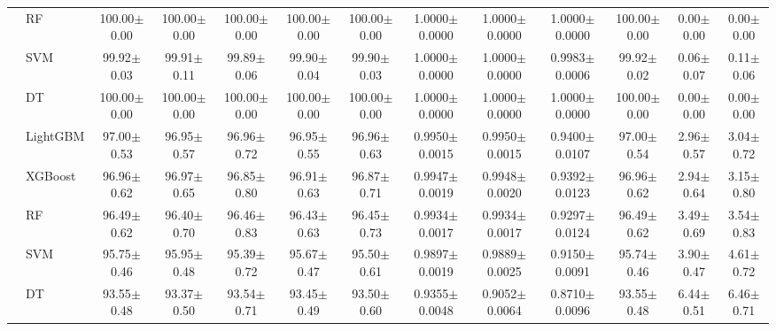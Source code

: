 \begin{tabular}{@{}llccccccccccc@{}}
 & RF & 100.00{\tiny$\pm$0.00} & 100.00{\tiny$\pm$0.00} & 100.00{\tiny$\pm$0.00} & 100.00{\tiny$\pm$0.00} & 100.00{\tiny$\pm$0.00} & 1.0000{\tiny$\pm$0.0000} & 1.0000{\tiny$\pm$0.0000} & 1.0000{\tiny$\pm$0.0000} & 100.00{\tiny$\pm$0.00} & 0.00{\tiny$\pm$0.00} & 0.00{\tiny$\pm$0.00}\\
 & SVM & 99.92{\tiny$\pm$0.03} & 99.91{\tiny$\pm$0.11} & 99.89{\tiny$\pm$0.06} & 99.90{\tiny$\pm$0.04} & 99.90{\tiny$\pm$0.03} & 1.0000{\tiny$\pm$0.0000} & 1.0000{\tiny$\pm$0.0000} & 0.9983{\tiny$\pm$0.0006} & 99.92{\tiny$\pm$0.02} & 0.06{\tiny$\pm$0.07} & 0.11{\tiny$\pm$0.06}\\
 & DT & 100.00{\tiny$\pm$0.00} & 100.00{\tiny$\pm$0.00} & 100.00{\tiny$\pm$0.00} & 100.00{\tiny$\pm$0.00} & 100.00{\tiny$\pm$0.00} & 1.0000{\tiny$\pm$0.0000} & 1.0000{\tiny$\pm$0.0000} & 1.0000{\tiny$\pm$0.0000} & 100.00{\tiny$\pm$0.00} & 0.00{\tiny$\pm$0.00} & 0.00{\tiny$\pm$0.00}\\
\midrule
{} & LightGBM & 97.00{\tiny$\pm$0.53} & 96.95{\tiny$\pm$0.57} & 96.96{\tiny$\pm$0.72} & 96.95{\tiny$\pm$0.55} & 96.96{\tiny$\pm$0.63} & 0.9950{\tiny$\pm$0.0015} & 0.9950{\tiny$\pm$0.0015} & 0.9400{\tiny$\pm$0.0107} & 97.00{\tiny$\pm$0.54} & 2.96{\tiny$\pm$0.57} & 3.04{\tiny$\pm$0.72}\\
 & XGBoost & 96.96{\tiny$\pm$0.62} & 96.97{\tiny$\pm$0.65} & 96.85{\tiny$\pm$0.80} & 96.91{\tiny$\pm$0.63} & 96.87{\tiny$\pm$0.71} & 0.9947{\tiny$\pm$0.0019} & 0.9948{\tiny$\pm$0.0020} & 0.9392{\tiny$\pm$0.0123} & 96.96{\tiny$\pm$0.62} & 2.94{\tiny$\pm$0.64} & 3.15{\tiny$\pm$0.80}\\
 & RF & 96.49{\tiny$\pm$0.62} & 96.40{\tiny$\pm$0.70} & 96.46{\tiny$\pm$0.83} & 96.43{\tiny$\pm$0.63} & 96.45{\tiny$\pm$0.73} & 0.9934{\tiny$\pm$0.0017} & 0.9934{\tiny$\pm$0.0017} & 0.9297{\tiny$\pm$0.0124} & 96.49{\tiny$\pm$0.62} & 3.49{\tiny$\pm$0.69} & 3.54{\tiny$\pm$0.83}\\
 & SVM & 95.75{\tiny$\pm$0.46} & 95.95{\tiny$\pm$0.48} & 95.39{\tiny$\pm$0.72} & 95.67{\tiny$\pm$0.47} & 95.50{\tiny$\pm$0.61} & 0.9897{\tiny$\pm$0.0019} & 0.9889{\tiny$\pm$0.0025} & 0.9150{\tiny$\pm$0.0091} & 95.74{\tiny$\pm$0.46} & 3.90{\tiny$\pm$0.47} & 4.61{\tiny$\pm$0.72}\\
 & DT & 93.55{\tiny$\pm$0.48} & 93.37{\tiny$\pm$0.50} & 93.54{\tiny$\pm$0.71} & 93.45{\tiny$\pm$0.49} & 93.50{\tiny$\pm$0.60} & 0.9355{\tiny$\pm$0.0048} & 0.9052{\tiny$\pm$0.0064} & 0.8710{\tiny$\pm$0.0096} & 93.55{\tiny$\pm$0.48} & 6.44{\tiny$\pm$0.51} & 6.46{\tiny$\pm$0.71}\\

\end{tabular}
